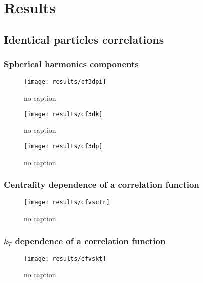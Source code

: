 \chapter{Results}
  \section{Identical particles correlations}
    \subsection{Spherical harmonics components}
      \begin{figure}[h]
        \centering
        \centerline{\texttt{[image: results/cf3dpi]}}
        \caption{no caption}
      \label{fig:cf3dpi}
      \end{figure}

      \begin{figure}[h]
        \centering
        \centerline{\texttt{[image: results/cf3dk]}}
        \caption{no caption}
      \label{fig:cf3dk}
      \end{figure} 

      \begin{figure}[h]
        \centering
        \centerline{\texttt{[image: results/cf3dp]}}
        \caption{no caption}
      \label{fig:cf3dp}
      \end{figure}  
    \FloatBarrier
    \subsection{Centrality dependence of a correlation function}
      \begin{figure}[h]
        \centering
        \centerline{\texttt{[image: results/cfvsctr]}}
        \caption{no caption}
      \label{fig:centr_dep}
      \end{figure}
    \FloatBarrier
    \subsection{$k_T$ dependence of a correlation function}
      \begin{figure}[h]
        \centering
        \centerline{\texttt{[image: results/cfvskt]}}
        \caption{no caption}
      \label{fig:kt_dep}
      \end{figure}
    \FloatBarrier
